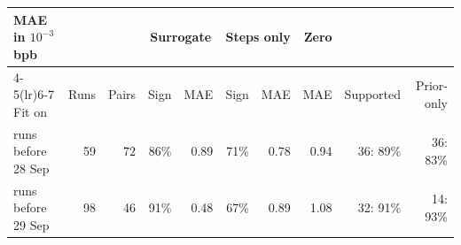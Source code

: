 {\footnotesize\setlength{\tabcolsep}{4pt}
\begin{tabular}{@{}lrrrrrrrrr@{}}
\toprule
MAE in $10^{-3}$ bpb & & & \multicolumn{2}{c}{Surrogate} & \multicolumn{2}{c}{Steps only} & Zero & & \\
\cmidrule(lr){4-5}\cmidrule(lr){6-7}
Fit on & Runs & Pairs & Sign & MAE & Sign & MAE & MAE & Supported & Prior-only \\
\midrule
runs before 28 Sep & 59 & 72 & 86\% & 0.89 & 71\% & 0.78 & 0.94 & 36: 89\% & 36: 83\% \\
runs before 29 Sep & 98 & 46 & 91\% & 0.48 & 67\% & 0.89 & 1.08 & 32: 91\% & 14: 93\% \\
\bottomrule
\end{tabular}
}

